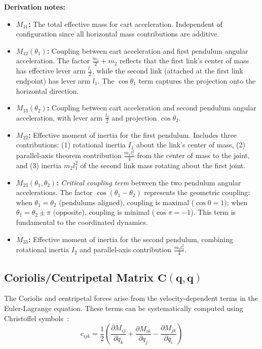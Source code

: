 \textbf{Derivation notes:}
\begin{itemize}
\item \textbf{$M_{11}$:} The total effective mass for cart acceleration. Independent of configuration since all horizontal mass contributions are additive.

\item \textbf{$M_{12}(\theta_1)$:} Coupling between cart acceleration and first pendulum angular acceleration. The factor $\frac{m_1}{2} + m_2$ reflects that the first link's center of mass has effective lever arm $\frac{l_1}{2}$, while the second link (attached at the first link endpoint) has lever arm $l_1$. The $\cos\theta_1$ term captures the projection onto the horizontal direction.

\item \textbf{$M_{13}(\theta_2)$:} Coupling between cart acceleration and second pendulum angular acceleration, with lever arm $\frac{l_2}{2}$ and projection $\cos\theta_2$.

\item \textbf{$M_{22}$:} Effective moment of inertia for the first pendulum. Includes three contributions: (1) rotational inertia $I_1$ about the link's center of mass, (2) parallel-axis theorem contribution $\frac{m_1 l_1^2}{4}$ from the center of mass to the joint, and (3) inertia $m_2 l_1^2$ of the second link mass rotating about the first joint.

\item \textbf{$M_{23}(\theta_1, \theta_2)$:} \textit{Critical coupling term} between the two pendulum angular accelerations. The factor $\cos(\theta_1 - \theta_2)$ represents the geometric coupling: when $\theta_1 = \theta_2$ (pendulums aligned), coupling is maximal ($\cos 0 = 1$); when $\theta_1 = \theta_2 \pm \pi$ (opposite), coupling is minimal ($\cos \pi = -1$). This term is fundamental to the coordinated dynamics.

\item \textbf{$M_{33}$:} Effective moment of inertia for the second pendulum, combining rotational inertia $I_2$ and parallel-axis contribution $\frac{m_2 l_2^2}{4}$.
\end{itemize}

\subsection{Coriolis/Centripetal Matrix $\mathbf{C}(\mathbf{q}, \dot{\mathbf{q}})$}

The Coriolis and centripetal forces arise from the velocity-dependent terms in the Euler-Lagrange equation. These terms can be systematically computed using Christoffel symbols~\cite{spong2006robot}:
\begin{equation}
c_{ijk} = \frac{1}{2}\left( \frac{\partial M_{ij}}{\partial q_k} + \frac{\partial M_{ik}}{\partial q_j} - \frac{\partial M_{jk}}{\partial q_i} \right)
\label{eq:christoffel}
\end{equation}

